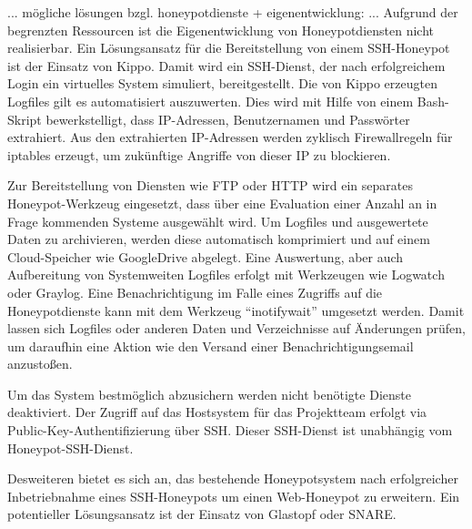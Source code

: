 ... mögliche lösungen bzgl. honeypotdienste + eigenentwicklung: ...
Aufgrund der begrenzten Ressourcen ist die Eigenentwicklung von Honeypotdiensten  nicht realisierbar. Ein Lösungsansatz für die Bereitstellung von einem SSH-Honeypot ist der Einsatz von Kippo. Damit wird ein SSH-Dienst, der nach erfolgreichem Login ein virtuelles System simuliert, bereitgestellt. Die von Kippo erzeugten Logfiles gilt es automatisiert auszuwerten. Dies wird mit Hilfe von einem Bash-Skript bewerkstelligt, dass IP-Adressen, Benutzernamen und Passwörter extrahiert. Aus den extrahierten IP-Adressen werden zyklisch Firewallregeln für iptables erzeugt, um zukünftige Angriffe von dieser IP zu blockieren.

Zur Bereitstellung von Diensten wie FTP oder HTTP wird ein separates Honeypot-Werkzeug eingesetzt, dass über eine Evaluation einer Anzahl an in Frage kommenden Systeme ausgewählt wird.
Um Logfiles und ausgewertete Daten zu archivieren, werden diese automatisch komprimiert und auf einem Cloud-Speicher wie GoogleDrive abgelegt. Eine Auswertung, aber auch Aufbereitung von Systemweiten Logfiles erfolgt mit Werkzeugen wie Logwatch oder Graylog.
Eine Benachrichtigung im Falle eines Zugriffs auf die Honeypotdienste kann mit dem Werkzeug “inotifywait” umgesetzt werden. Damit lassen sich Logfiles oder anderen Daten und Verzeichnisse auf Änderungen prüfen, um daraufhin eine Aktion wie den Versand einer Benachrichtigungsemail anzustoßen.


Um das System bestmöglich abzusichern werden nicht benötigte Dienste deaktiviert. Der Zugriff auf das Hostsystem für das Projektteam erfolgt via Public-Key-Authentifizierung über SSH. Dieser SSH-Dienst ist unabhängig vom Honeypot-SSH-Dienst.

Desweiteren bietet es sich an, das bestehende Honeypotsystem nach erfolgreicher Inbetriebnahme eines SSH-Honeypots um einen Web-Honeypot zu erweitern. Ein potentieller Lösungsansatz ist der Einsatz von Glastopf oder SNARE.
